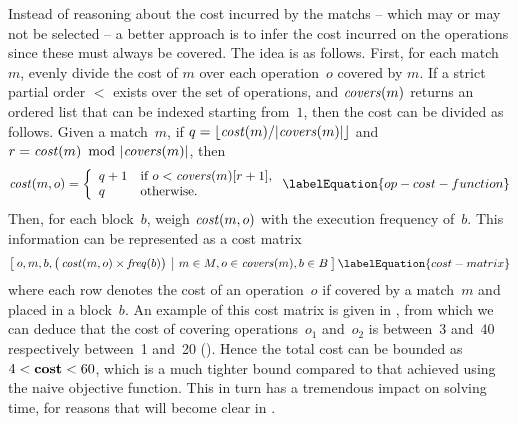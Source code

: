 Instead of reasoning about the cost incurred by the \glspl{match} -- which may
or may not be selected -- a better approach is to infer the cost incurred on the
\glspl{operation} since these must always be covered.
%
The idea is as follows.
%
First, for each \gls{match}~$m$, evenly divide the cost of $m$ over each
\gls{operation}~$o$ covered by $m$.
%
If a strict partial order $<$ exists over the set of \glspl{operation}, and
$\operatorname{\textrm{\textit{covers}}}(m)$ returns an ordered list that can be indexed starting from~$1$,
then the cost can be divided as follows.
%
Given a match~$m$, if \mbox{$q = \lfloor \mCost(m) / \mCard{\!\mCovers(m)}
  \rfloor$} and \mbox{$r = \mCost(m) \! \mod \mCard{\!\mCovers(m)}$}, then
%
\begin{equation}
  \mOpCost(m, o) =
  \left\{
  \begin{array}{ll}
    q + 1 & \text{if $o < \mCovers(m)[r+1]$}, \\
    q     & \text{otherwise}. \\
  \end{array}
  \right.
  \labelEquation{op-cost-function}
\end{equation}
%
Then, for each \gls{block}~$b$, weigh \mbox{$\operatorname{\textrm{\textit{cost}}}(m, o)$} with the execution
frequency of~$b$.
%
This information can be represented as a cost matrix
%
\begin{equation}
  \begin{bmatrix}
    \begin{array}{@{\:}c|c@{\:}}
        o, m, b, \big( \mOpCost(m, o) \times \mFreq(b) \big)
      & m \in \mMatchSet, o \in \mCovers(m), b \in \mBlockSet
    \end{array}
  \end{bmatrix}
  \labelEquation{cost-matrix}
\end{equation}
where each row denotes the cost of an \gls{operation}~$o$ if covered by a
\gls{match}~$m$ and placed in a \gls{block}~$b$.
%
An example of this cost matrix is given in , from which
we can deduce that the cost of covering operations~$o_1$ and~$o_2$ is between~3
and~40 respectively between~1 and~20 ().
%
Hence the total cost can be bounded as \mbox{$4 < \mVar{cost} < 60$}, which is a
much tighter bound compared to that achieved using the naive \gls{objective
  function}.
%
This in turn has a tremendous impact on solving time, for reasons that will
become clear in .

